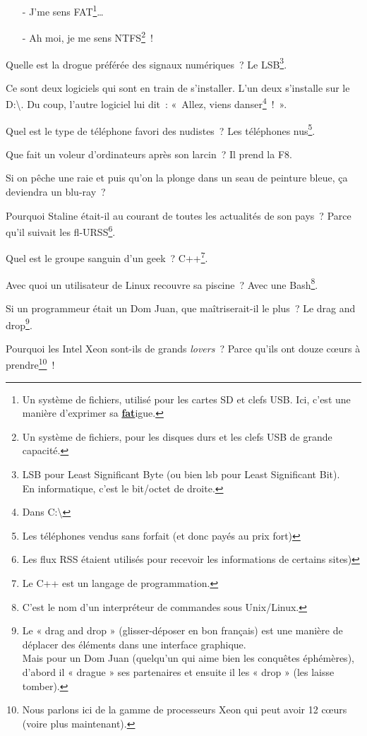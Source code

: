 \documentclass[10pt,a5paper,fullpage]{book}
\begin{document}
\begin{enumerate}
{		\begin{itemize}
			\item[-] J’me sens FAT\footnote{Un système de fichiers, utilisé pour les cartes SD et clefs USB. Ici, c'est une manière d'exprimer sa \textbf{\underline{fat}}igue.}\ldots
			\item[-] Ah moi, je me sens NTFS\footnote{Un système de fichiers, pour les disques durs et les clefs USB de grande capacité.}~!
		\end{itemize}
		\item Quelle est la drogue préférée des signaux numériques~? Le LSB\footnote{LSB pour Least Significant Byte (ou bien lsb pour Least Significant Bit). \\En informatique, c’est le bit/octet de droite.}.
		\item Ce sont deux logiciels qui sont en train de s’installer. L’un deux s’installe sur le D:\textbackslash. Du coup, l’autre logiciel lui dit~: « Allez, viens danser\footnote{Dans C:\textbackslash}~! ».
		\item Quel est le type de téléphone favori des nudistes~? Les téléphones nus\footnote{Les téléphones vendus sans forfait (et donc payés au prix fort)}.
		\item Que fait un voleur d’ordinateurs après son larcin~? Il prend la F8.
		\item Si on pêche une raie et puis qu’on la plonge dans un seau de peinture bleue, ça deviendra un blu-ray~?
		\item Pourquoi Staline était-il au courant de toutes les actualités de son pays~? Parce qu’il suivait les fl-URSS\footnote{Les flux RSS étaient utilisés pour recevoir les informations de certains sites)}.
		\item Quel est le groupe sanguin d’un geek~? C++\footnote{Le C++ est un langage de programmation.}.
		\item Avec quoi un utilisateur de Linux recouvre sa piscine~? Avec une Bash\footnote{C'est le nom d'un interpréteur de commandes sous Unix/Linux.}.
		\item Si un programmeur était un Dom Juan, que maîtriserait-il le plus~? Le drag and drop\footnote{Le « drag and drop » (glisser-déposer en bon français) est une manière de déplacer des éléments dans une interface graphique.\\ Mais pour un Dom Juan (quelqu'un qui aime bien les conquêtes éphémères), d’abord il « drague » ses partenaires et ensuite il les « drop » (les laisse tomber).}. 
		\item Pourquoi les Intel Xeon sont-ils de grands \textit{lovers}~? Parce qu'ils ont douze cœurs à prendre\footnote{Nous parlons ici de la gamme de processeurs Xeon qui peut avoir 12 cœurs (voire plus maintenant).}~!
}
\end{enumerate}
\end{document}
